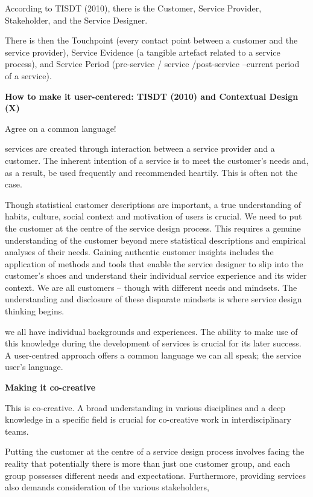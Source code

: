 According to TISDT (2010), there is the Customer, Service Provider, Stakeholder, and the Service Designer.

There is then the Touchpoint (every contact point between a customer and the service provider), Service Evidence (a tangible artefact related to a service process), and Service Period (pre-service / service /post-service --current period of a service).


\textbf{How to make it user-centered: TISDT (2010) and Contextual Design (X)}

Agree on a common language!

services are created through interaction between a service provider and a customer. The inherent intention of a service is to meet the customer’s needs and, as a result, be used frequently and recommended heartily. This is often not the case.

Though statistical customer descriptions are important, a true understanding of habits, culture, social context and motivation of users is crucial. We need to put the customer at the centre of the service design process. This requires a genuine understanding of the customer beyond mere statistical descriptions and empirical analyses of their needs. Gaining authentic customer insights includes the application of methods and tools that enable the service designer to slip into the customer’s shoes and understand their individual service experience and its wider context. We are all customers – though with different needs and mindsets. The understanding and disclosure of these disparate mindsets is where service design thinking begins.

we all have individual backgrounds and experiences. The ability to make use of this knowledge during the development of services is crucial for its later success. A user-centred approach offers a common language we can all speak; the service user’s language.

\textbf{Making it co-creative}

This is co-creative.
A broad understanding in various disciplines and a deep knowledge in a specific field is crucial for co-creative work in interdisciplinary teams.


Putting the customer at the centre of a service design process involves facing the reality that potentially there is more than just one customer group, and each group possesses different needs and expectations.
Furthermore, providing services also demands consideration of the various stakeholders,

